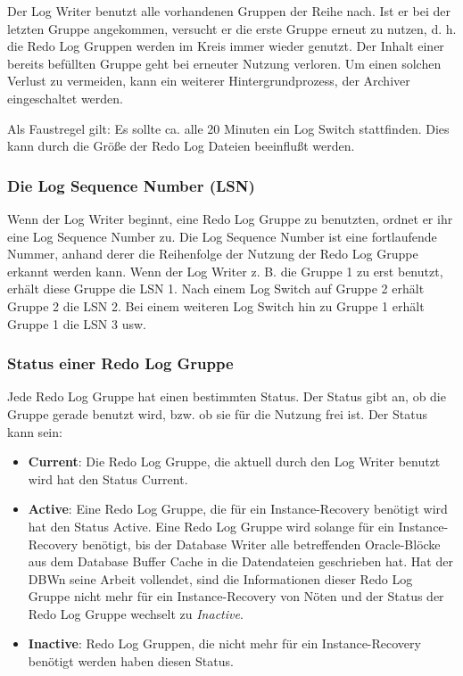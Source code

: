             Der Log Writer benutzt alle vorhandenen Gruppen der Reihe nach. Ist er bei der letzten Gruppe angekommen, versucht er die erste Gruppe erneut zu nutzen, d. h. die Redo Log Gruppen werden im Kreis immer wieder genutzt. Der Inhalt einer bereits befüllten Gruppe geht bei erneuter Nutzung verloren. Um einen solchen Verlust zu vermeiden, kann ein weiterer Hintergrundprozess, der Archiver eingeschaltet werden.

            \begin{merke}
              Als Faustregel gilt: Es sollte ca. alle 20 Minuten ein Log Switch stattfinden. Dies kann durch die Größe der Redo Log Dateien beeinflußt werden.
            \end{merke}
          \subsubsection{Die Log Sequence Number (LSN)}
            Wenn der Log Writer beginnt, eine Redo Log Gruppe zu benutzten, ordnet er ihr eine Log Sequence Number zu. Die Log Sequence Number ist eine fortlaufende Nummer, anhand derer die Reihenfolge der Nutzung der Redo Log Gruppe erkannt werden kann. Wenn der Log Writer z. B. die Gruppe 1 zu erst benutzt, erhält diese Gruppe die LSN 1. Nach einem Log Switch auf Gruppe 2 erhält Gruppe 2 die LSN 2. Bei einem weiteren Log Switch hin zu Gruppe 1 erhält Gruppe 1 die LSN 3 usw.
          \subsubsection{Status einer Redo Log Gruppe}
            Jede Redo Log Gruppe hat einen bestimmten Status. Der Status gibt an, ob die Gruppe gerade benutzt wird, bzw. ob sie für die Nutzung frei ist. Der Status kann sein:
            \begin{itemize}
              \item \textbf{Current}: Die Redo Log Gruppe, die aktuell durch den
              Log Writer benutzt wird hat den Status Current.
              \item \textbf{Active}: Eine Redo Log Gruppe, die für ein
              Instance-Recovery benötigt wird hat den Status Active. Eine Redo
              Log Gruppe wird solange für ein Instance-Recovery benötigt,
              bis der Database Writer alle betreffenden Oracle-Blöcke aus dem
              Database Buffer Cache in die Datendateien geschrieben hat. Hat der
              DBWn seine Arbeit vollendet, sind die Informationen dieser Redo
              Log Gruppe nicht mehr für ein Instance-Recovery von Nöten und
              der Status der Redo Log Gruppe wechselt zu \textit{Inactive}.
              \item \textbf{Inactive}: Redo Log Gruppen, die nicht mehr für
              ein Instance-Recovery benötigt werden haben diesen Status.
            \end{itemize}

